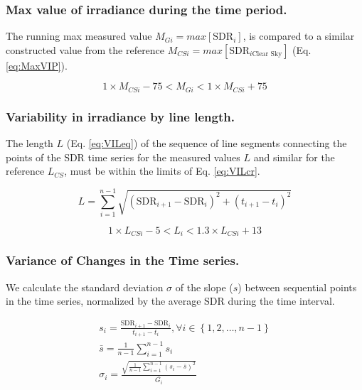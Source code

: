 \documentclass[preprint, 3p,
authoryear]{elsarticle} %
\begin{document}
\hypertarget{max-value-of-irradiance-during-the-time-period.}{%
\subsubsection{Max value of irradiance during the time
period.}\label{max-value-of-irradiance-during-the-time-period.}}

The running max measured value \(M_{Gi} = max[\text{SDR}_{i}]\), is
compared to a similar constructed value from the reference
\(M_{CSi} = max[\text{SDR}_{i\text{Clear Sky}}]\) (Eq. \ref{eq:MaxVIP}).

\begin{equation}
1 \times M_{CSi} - 75
< M_{Gi} <
1 \times M_{CSi} + 75
\label{eq:MaxVIP}
\end{equation}

\hypertarget{variability-in-irradiance-by-line-length.}{%
\subsubsection{Variability in irradiance by line
length.}\label{variability-in-irradiance-by-line-length.}}

The length \(L\) (Eq. \ref{eq:VILeq}) of the sequence of line segments
connecting the points of the SDR time series for the measured values
\(L\) and similar for the reference \(L_{CS}\), must be within the
limits of Eq. \ref{eq:VILcr}.

\begin{equation}
L = \sum_{i=1}^{n-1}\sqrt{\left ( \text{SDR}_{i+1} - \text{SDR}_{i}\right )^2 + \left ( t_{i+1} - t_i \right )^2}
\label{eq:VILeq}
\end{equation}

\begin{equation}
1 \times L_{CSi} - 5 < L_i < 1.3 \times L_{CSi} + 13
\label{eq:VILcr}
\end{equation}

\hypertarget{variance-of-changes-in-the-time-series.}{%
\subsubsection{Variance of Changes in the Time
series.}\label{variance-of-changes-in-the-time-series.}}

We calculate the standard deviation \(\sigma\) of the slope (\(s\))
between sequential points in the time series, normalized by the average
SDR during the time interval.

\begin{gather}
s_i = \frac{\text{SDR}_{i+1} - \text{SDR}_{i}}{t_{i+1} - t_i}, \forall i \in \left \{ 1, 2, \ldots, n-1 \right \} \label{eq:VCT1} \\
\bar{s} = \frac{1}{n-1} \sum_{i=1}^{n-1} s_i \label{eq:VCT2} \\
\sigma_i = \frac {\sqrt{\frac{1}{n-1} \sum_{i=1}^{n-1} \left( s_i - \bar{s} \right)^2} } {\bar{G_i}} \label{eq:VCT3}
\end{gather}
\end{document}
